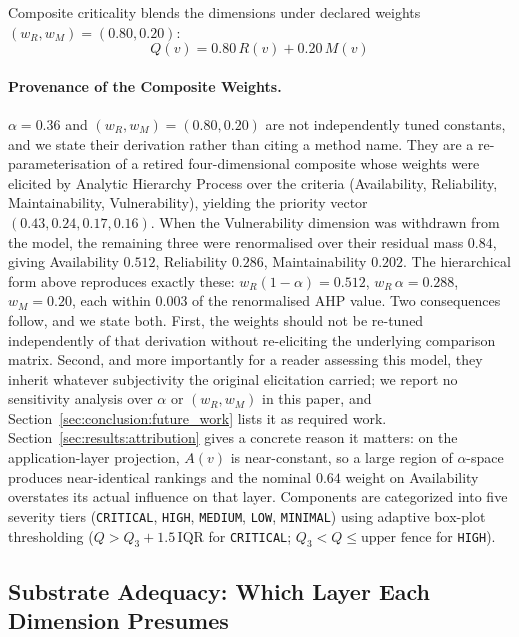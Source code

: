 Composite criticality blends the dimensions under declared weights $(w_R, w_M) = (0.80, 0.20)$:
\begin{equation}
Q(v) = 0.80\,R(v) + 0.20\,M(v)
\end{equation}

\paragraph{Provenance of the Composite Weights.}
$\alpha = 0.36$ and $(w_R, w_M) = (0.80, 0.20)$ are not independently tuned constants, and we
state their derivation rather than citing a method name. They are a re-parameterisation of a
retired four-dimensional composite whose weights were elicited by Analytic Hierarchy Process
\citep{saaty1980analytic} over the criteria (Availability, Reliability, Maintainability,
Vulnerability), yielding the priority vector $(0.43, 0.24, 0.17, 0.16)$. When the Vulnerability
dimension was withdrawn from the model, the remaining three were renormalised over their residual
mass $0.84$, giving Availability $0.512$, Reliability $0.286$, Maintainability $0.202$. The
hierarchical form above reproduces exactly these: $w_R(1-\alpha) = 0.512$,
$w_R\,\alpha = 0.288$, $w_M = 0.20$, each within $0.003$ of the renormalised AHP value. Two
consequences follow, and we state both. First, the weights should not be re-tuned independently of
that derivation without re-eliciting the underlying comparison matrix. Second, and more
importantly for a reader assessing this model, they inherit whatever subjectivity the original
elicitation carried; we report no sensitivity analysis over $\alpha$ or $(w_R, w_M)$ in this paper,
and Section~\ref{sec:conclusion:future_work} lists it as required work. Section~\ref{sec:results:attribution}
gives a concrete reason it matters: on the application-layer projection, $A(v)$ is near-constant, so
a large region of $\alpha$-space produces near-identical rankings and the nominal $0.64$ weight on
Availability overstates its actual influence on that layer.
Components are categorized into five severity tiers (\texttt{CRITICAL}, \texttt{HIGH}, \texttt{MEDIUM}, \texttt{LOW}, \texttt{MINIMAL}) using adaptive box-plot thresholding ($Q > Q_3 + 1.5\,\mathrm{IQR}$ for \texttt{CRITICAL}; $Q_3 < Q \le \text{upper fence}$ for \texttt{HIGH}).

\subsection{Substrate Adequacy: Which Layer Each Dimension Presumes}
\label{sec:model:substrate}

